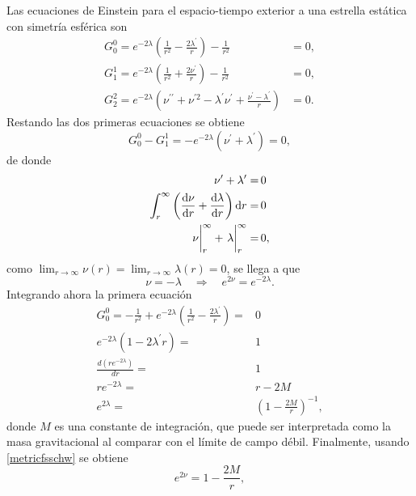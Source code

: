 \normalsize
Las ecuaciones de Einstein para el espacio-tiempo exterior a una estrella estática con simetría esférica son
\begin{align}
     G _ { 0 } ^ { 0 } = e ^ { - 2 \lambda } \left( \frac { 1 } { r ^ { 2 } } - \frac { 2 \lambda ^ { \prime } } { r } \right) - \frac { 1 } { r ^ { 2 } } &= 0, \\
      G _ { 1 } ^ { 1 } = e ^ { - 2 \lambda } \left( \frac { 1 } { r ^ { 2 } } + \frac { 2 \nu ^ { \prime } } { r } \right) - \frac { 1 } { r ^ { 2 } } &= 0, \\
      G _ { 2 } ^ { 2 } = e ^ { - 2 \lambda } \left( \nu ^ { \prime \prime } + \nu ^ { \prime 2 } - \lambda ^ { \prime } \nu ^ { \prime } + \frac { \nu ^ { \prime } - \lambda ^ { \prime } } { r } \right) &=0.
\end{align}
Restando las dos primeras ecuaciones se obtiene
\begin{equation*}
    G _ { 0 } ^ { 0} - G _ { 1 } ^ { 1} = -e^{-2\lambda} (\nu^{\prime}+\lambda^{\prime}) = 0, 
\end{equation*}
de donde
\begin{align*}
    \nu^{\prime}+\lambda^{\prime} =& \,0 \\
    \int_{r}^{\infty} \qty(\dv{\nu}{r}+\dv{\lambda}{r})\dd{r} =& \,0 \\
    \eval{\nu}_{r}^{\infty} + \eval{\lambda}_{r}^{\infty} =& \, 0,
\end{align*}
como $\lim_{r\to \infty}\nu(r)=\lim_{r\to \infty}\lambda(r)=0$, se llega a que
\begin{equation}
    \nu=-\lambda \quad \Longrightarrow \quad e^{2\nu}=e^{-2\lambda}. \label{metricfsschw}
\end{equation}
Integrando ahora la primera ecuación
\begin{align}
    G _ { 0 } ^ { 0} = -\frac{1}{r^{2}}+e^{-2\lambda}\left(\frac{1}{r^{2}}-\frac{2 \lambda^{\prime}}{r}\right) =& 0 \nonumber \\
    e^{-2\lambda}\left(1-2 \lambda^{\prime} r \right) =& 1 \nonumber \\
    \frac{d\left(r e^{-2 \lambda}\right)}{d r} =& 1 \nonumber \\ 
    r e^{-2 \lambda} =& r - 2 M  \nonumber \\
    e^{2 \lambda} =& \left(1-\frac{2 M}{r}\right)^{-1},
\end{align}
donde $M$ es una constante de integración, que puede ser interpretada como la masa gravitacional al comparar con el límite de campo débil. Finalmente, usando \eqref{metricfsschw} se obtiene
\begin{equation}
    e^{2\nu}=1-\frac{2 M}{r},
\end{equation}




